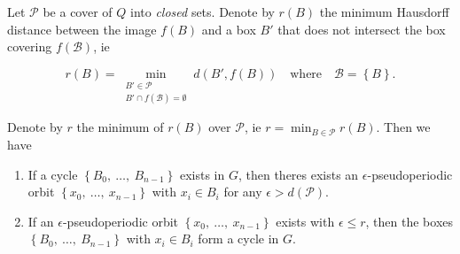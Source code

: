 \begin{proposition}
    \cite*{chain,dynbook}
    Let $\mathcal{P}$ be a cover of $Q$ into \emph{closed} sets. 
    Denote by $r(B)$ the minimum Hausdorff distance between the image $f(B)$ and a 
    box $B'$ that does not intersect the box covering $f(\mathcal{B})$, ie 
    
    \begin{equation}
        r(B) = \min_{\substack{B' \in \mathcal{P}\ \\ B' \cap f(\mathcal{B}) = \emptyset}} d(B', f(B)) 
        \quad \text{where} \quad \mathcal{B} = \left\{ B \right\}.
    \end{equation}
    
    Denote by $r$ the minimum of $r(B)$ over $\mathcal{P}$, ie 
    $r = \min_{B \in \mathcal{P}} r(B)$. Then we have

    \begin{enumerate}
        \item If a cycle $\left\{ B_0,\ \ldots,\ B_{n-1} \right\}$ exists in $G$, then 
        theres exists an $\epsilon$-pseudoperiodic orbit 
        $\left\{ x_0,\ \ldots,\ x_{n-1} \right\}$ with $x_i \in B_i$ for any 
        $\epsilon > d(\mathcal{P})$. 
        \item If an $\epsilon$-pseudoperiodic orbit 
        $\left\{ x_0,\ \ldots,\ x_{n-1} \right\}$ exists with $\epsilon \leq r$, then the 
        boxes $\left\{ B_0,\ \ldots,\ B_{n-1} \right\}$ with $x_i \in B_i$ form a cycle in 
        $G$. 
    \end{enumerate}

\end{proposition}

